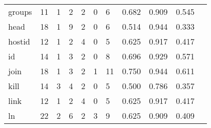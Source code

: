 \begin{longtable}{lp{1.10cm}p{1.10cm}p{1.10cm}p{1.10cm}p{1.10cm}p{1.10cm}p{1.10cm}p{1.10cm}p{1.10cm}p{1.10cm}}
groups    &                     11 &                                  1 &                                 2 &                                2 &                                 0 &                               6 &                          0.682 &                                 0.909 &                               0.545 \\
head      &                     18 &                                  1 &                                 9 &                                2 &                                 0 &                               6 &                          0.514 &                                 0.944 &                               0.333 \\
hostid    &                     12 &                                  1 &                                 2 &                                4 &                                 0 &                               5 &                          0.625 &                                 0.917 &                               0.417 \\
id        &                     14 &                                  1 &                                 3 &                                2 &                                 0 &                               8 &                          0.696 &                                 0.929 &                               0.571 \\
join      &                     18 &                                  1 &                                 3 &                                2 &                                 1 &                              11 &                          0.750 &                                 0.944 &                               0.611 \\
kill      &                     14 &                                  3 &                                 4 &                                2 &                                 0 &                               5 &                          0.500 &                                 0.786 &                               0.357 \\
link      &                     12 &                                  1 &                                 2 &                                4 &                                 0 &                               5 &                          0.625 &                                 0.917 &                               0.417 \\
ln        &                     22 &                                  2 &                                 6 &                                2 &                                 3 &                               9 &                          0.625 &                                 0.909 &                               0.409 \\

\end{longtable}
